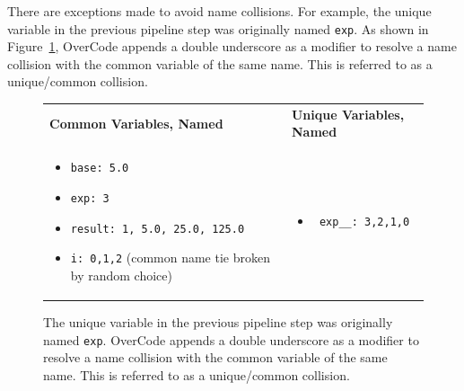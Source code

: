 \documentclass[12pt,twoside]{mitthesis}
\newcommand \codevar[1]{\texttt{#1}}
\begin{document}
There are exceptions made to avoid name collisions. For example, the unique variable in the previous pipeline step was originally named \codevar{exp}. As shown in Figure~\ref{fig:uniqcomm}, OverCode appends a double underscore as a modifier to resolve a name collision with the common variable of the same name. This is referred to as a unique/common collision.
\begin{figure}
\begin{tabular}{ll}
{\bf Common Variables, Named} & {\bf Unique Variables, Named} \\
\begin{minipage}{0.5\linewidth}
 \begin{itemize} 
\item \texttt{base: 5.0} 
\item \texttt{exp: 3} 
\item \texttt{result: 1, 5.0, 25.0, 125.0}
\item \texttt{i: 0,1,2} (common name tie broken by random choice)
 \end{itemize} 
\end{minipage}
&
\begin{minipage}{0.5\linewidth}
 \begin{itemize} 
\item \begin{verbatim} exp__: 3,2,1,0 \end{verbatim}
 \end{itemize} 
\end{minipage}

\end{tabular}
\caption{The unique variable in the previous pipeline step was originally named \codevar{exp}. OverCode appends a double underscore as a modifier to resolve a name collision with the common variable of the same name. This is referred to as a unique/common collision.}
\label{fig:uniqcomm}
\end{figure}
\end{document}
